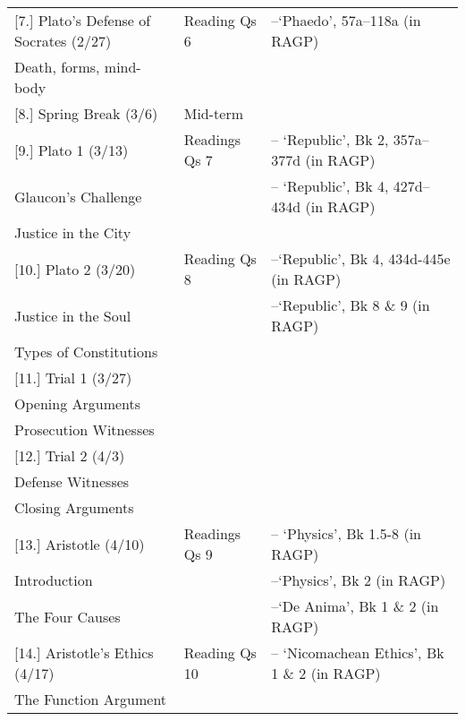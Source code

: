 \documentclass[article,oneside]{memoir}
\begin{document}
\begin{landscape}
\begin{center}
\begin{longtable}{p{8cm}p{4cm}p{8cm}}
[7.] Plato's Defense of Socrates (2/27)		& Reading Qs 6				& --`Phaedo', 57a--118a (in RAGP)	 \\
Death, forms, mind-body					 &  							&  \\ [1\baselineskip]  \midrule

	
[8.] Spring Break (3/6)		 			& Mid-term				    	 &  \\ [1\baselineskip]  \midrule
  

							
[9.] Plato 1 (3/13)					& Readings Qs	7		& -- `Republic', Bk 2, 357a--377d (in RAGP)  \\ 
Glaucon's Challenge					& 	 				& -- `Republic', Bk 4, 427d--434d (in RAGP) \\ 
Justice in the City 					&					&    	\\ [1\baselineskip] \midrule

[10.] Plato 2 (3/20)					& Reading Qs 8				& --`Republic', Bk 4, 434d-445e (in RAGP) \\
Justice in the Soul	         			& 					& --`Republic', Bk 8 \& 9 (in RAGP)   \\  
Types of Constitutions                    		& 					&   \\ [1\baselineskip] \midrule
	

[11.] Trial 1 (3/27)					&  				&  \\
Opening Arguments				 	&  				&  \\  
Prosecution Witnesses			 	&  				&  \\  [1\baselineskip] \midrule

                            

[12.] Trial 2  (4/3)					&             		  	&  \\ 
Defense Witnesses			    		& 				&  \\ 
Closing Arguments					&  				&  \\  [1\baselineskip] \midrule


							
							
[13.] Aristotle (4/10)					& Readings Qs 9 		& -- `Physics',  Bk 1.5-8 (in RAGP)  \\ %
Introduction						&					& --`Physics', Bk 2 (in RAGP) \\ 				
The Four Causes					&					& --`De Anima', Bk 1 \& 2 (in RAGP) \\ [1\baselineskip] \midrule
			


[14.] Aristotle's Ethics (4/17)			& Reading Qs 10 				& -- `Nicomachean Ethics', Bk 1 \& 2 (in RAGP) \\
The Function Argument				&					& 	 \\ [\baselineskip] \midrule



\end{longtable}
\end{center}
\end{landscape}
\end{document}
